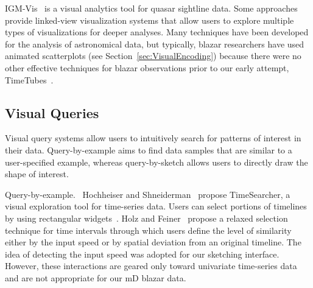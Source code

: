 IGM-Vis~\cite{Burchett2019} is a visual analytics tool for quasar sightline data.
Some approaches~\cite{Haroz2008, Li2008, Preston2016, McCurdy2019, Burchett2019} provide linked-view visualization systems that allow users to explore multiple types of visualizations for deeper analyses.
Many techniques have been developed for the analysis of astronomical data, 
but typically, blazar researchers have used animated scatterplots (see Section~\ref{sec:VisualEncoding}) 
because there were no other effective techniques for blazar observations prior to our early attempt, TimeTubes~\cite{Fujishiro2018}.

\subsection{Visual Queries}\label{sec:relatedFeature}
Visual query systems allow users to intuitively search for patterns of interest in their data.
Query-by-example aims to find data samples that are similar to a user-specified example,
whereas query-by-sketch allows users to directly draw the shape of interest.

\textsf{Query-by-example.\ }
Hochheiser and Shneiderman~\cite{Hochheiser2004} propose TimeSearcher, a visual exploration tool for time-series data. Users can select portions of timelines by using rectangular widgets~\cite{Buono2005, Buono2008}.
Holz and Feiner~\cite{Holz2009} propose a relaxed selection technique for time intervals through which users define the level of similarity either by the input speed or by spatial deviation from an original timeline.
The idea of detecting the input speed was adopted for our sketching interface.
However, these interactions are geared only toward univariate time-series data and are not appropriate for our mD blazar data.
%

